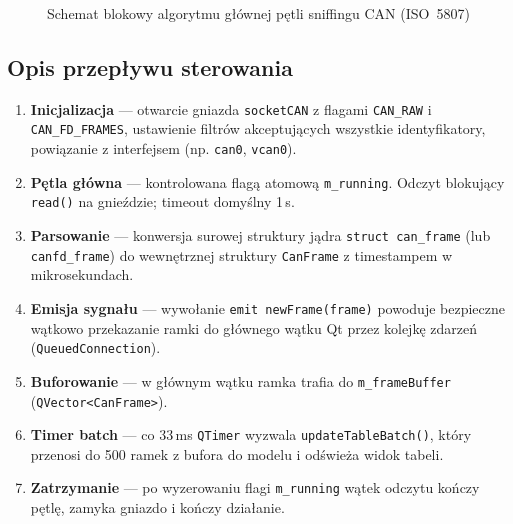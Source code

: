 \documentclass[12pt, a4paper]{article}
\begin{document}
\begin{figure}[H]
\caption{Schemat blokowy algorytmu głównej pętli sniffingu CAN (ISO~5807)}
\label{fig:algo}
\end{figure}

\subsection{Opis przepływu sterowania}

\begin{enumerate}
  \item \textbf{Inicjalizacja} --- otwarcie gniazda \texttt{socketCAN} z flagami
        \texttt{CAN\_RAW} i \texttt{CAN\_FD\_FRAMES}, ustawienie filtrów akceptujących
        wszystkie identyfikatory, powiązanie z interfejsem (np. \texttt{can0}, \texttt{vcan0}).
  \item \textbf{Pętla główna} --- kontrolowana flagą atomową \texttt{m\_running}.
        Odczyt blokujący \texttt{read()} na gnieździe; timeout domyślny 1\,s.
  \item \textbf{Parsowanie} --- konwersja surowej struktury jądra
        \texttt{struct can\_frame} (lub \texttt{canfd\_frame}) do wewnętrznej
        struktury \texttt{CanFrame} z timestampem w mikrosekundach.
  \item \textbf{Emisja sygnału} --- wywołanie \texttt{emit newFrame(frame)}
        powoduje bezpieczne wątkowo przekazanie ramki do głównego wątku Qt
        przez kolejkę zdarzeń (\texttt{QueuedConnection}).
  \item \textbf{Buforowanie} --- w głównym wątku ramka trafia do
        \texttt{m\_frameBuffer} (\texttt{QVector<CanFrame>}).
  \item \textbf{Timer batch} --- co 33\,ms \texttt{QTimer} wyzwala
        \texttt{updateTableBatch()}, który przenosi do 500 ramek z bufora
        do modelu i odświeża widok tabeli.
  \item \textbf{Zatrzymanie} --- po wyzerowaniu flagi \texttt{m\_running}
        wątek odczytu kończy pętlę, zamyka gniazdo i kończy działanie.
\end{enumerate}
\end{document}
